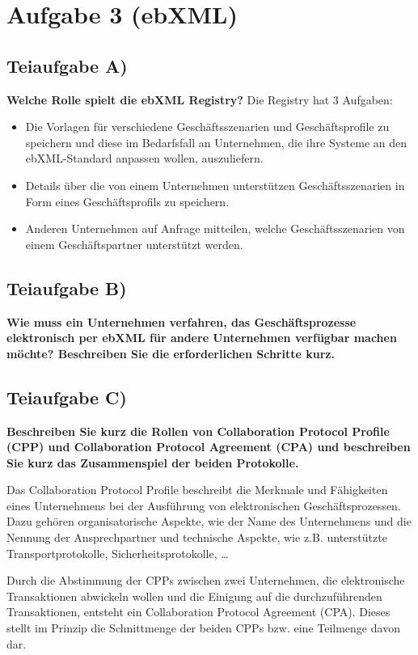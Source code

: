 \section{Aufgabe 3 (ebXML)}

\subsection{Teiaufgabe A)}
\textbf{Welche Rolle spielt die ebXML Registry?}
Die Registry hat 3 Aufgaben:

\begin{itemize}
  \item Die Vorlagen für verschiedene Geschäftsszenarien und Geschäftsprofile zu
speichern und diese im Bedarfsfall an Unternehmen, die ihre Systeme an den
ebXML-Standard anpassen wollen, auszuliefern.
  \item Details über die von einem Unternehmen unterstützen Geschäftsszenarien in
Form eines Geschäftsprofils zu speichern. 
  \item Anderen Unternehmen auf Anfrage mitteilen, welche Geschäftsszenarien von
einem Geschäftspartner unterstützt werden.
\end{itemize}

\subsection{Teiaufgabe B)}
\textbf{Wie muss ein Unternehmen verfahren, das Geschäftsprozesse elektronisch per
ebXML für andere Unternehmen verfügbar machen möchte? Beschreiben Sie die
erforderlichen Schritte kurz.}

\subsection{Teiaufgabe C)}
\textbf{Beschreiben Sie kurz die Rollen von Collaboration Protocol Profile (CPP) und
Collaboration Protocol Agreement (CPA) und beschreiben Sie kurz das
Zusammenspiel der beiden Protokolle.}

Das Collaboration Protocol Profile beschreibt die Merkmale und Fähigkeiten eines
Unternehmens bei der Ausführung von elektronischen Geschäftsprozessen. Dazu
gehören organisatorische Aspekte, wie der Name des Unternehmens und die
Nennung der Ansprechpartner und technische Aspekte, wie z.B. unterstützte
Transportprotokolle, Sicherheitsprotokolle, …

Durch die Abstimmung der CPPs zwischen zwei Unternehmen, die elektronische
Transaktionen abwickeln wollen und die Einigung auf die durchzuführenden
Transaktionen, entsteht ein Collaboration Protocol Agreement (CPA). Dieses stellt im
Prinzip die Schnittmenge der beiden CPPs bzw. eine Teilmenge davon dar.

\clearpage 